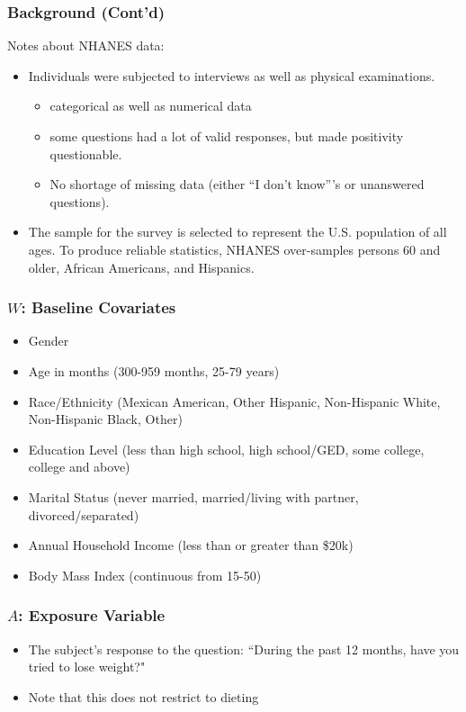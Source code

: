 \documentclass{beamer}
\begin{document}
\begin{frame}
  \frametitle{Background (Cont'd)}
  Notes about NHANES data:
  \begin{itemize}
 \item Individuals were subjected to interviews as well as physical examinations.
  \begin{itemize}
    \item categorical as well as numerical data
    \item some questions had a lot of valid responses, but made positivity questionable.
    \item No shortage of missing data (either ``I don't know'''s or unanswered questions).
  \end{itemize}
 \item The sample for the survey is selected to represent the U.S. population of all ages. To produce reliable statistics, NHANES over-samples persons 60 and older, African Americans, and Hispanics.
 \end{itemize}
\end{frame}

\begin{frame}
\frametitle{$W$: Baseline Covariates}
   \begin{itemize}
   \item Gender
   \item Age in months (300-959 months, 25-79 years)
   \item Race/Ethnicity (Mexican American, Other Hispanic, Non-Hispanic White, Non-Hispanic Black, Other)
   \item Education Level (less than high school, high school/GED, some college, college and above)
   \item Marital Status (never married, married/living with partner, divorced/separated)
   \item Annual Household Income (less than or greater than \$20k)
   \item Body Mass Index (continuous from 15-50)
  \end{itemize}

\end{frame}

\begin{frame}
 \frametitle{$A$: Exposure Variable}
  \begin{itemize}
    \item The subject's response to the question: ``During the past 12 months, have you tried to lose weight?"
    \item Note that this does not restrict to dieting
  \end{itemize}

\end{frame}
\end{document}
